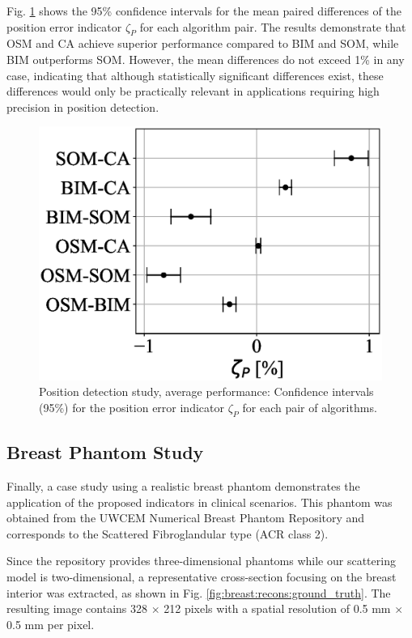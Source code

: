 \documentclass{IEEEtran}
\begin{document}
                Fig. \ref{fig:position:average:confidence_intervals} shows the 95\% confidence intervals for the mean paired differences of the position error indicator $\zeta_P$ for each algorithm pair. The results demonstrate that OSM and CA achieve superior performance compared to BIM and SOM, while BIM outperforms SOM. However, the mean differences do not exceed 1\% in any case, indicating that although statistically significant differences exist, these differences would only be practically relevant in applications requiring high precision in position detection.

                \begin{figure}
                    \centering
                    \includegraphics[width=.8\columnwidth]{./experiments/position/average/figs/confidence_intervals.eps}
                    \caption{Position detection study, average performance: Confidence intervals (95\%) for the position error indicator $\zeta_P$ for each pair of algorithms.}
                    \label{fig:position:average:confidence_intervals}
                \end{figure}

        \subsection{Breast Phantom Study}\label{sec:results:breast}

            Finally, a case study using a realistic breast phantom demonstrates the application of the proposed indicators in clinical scenarios. This phantom was obtained from the UWCEM Numerical Breast Phantom Repository \cite{burfeindt2012mri} and corresponds to the Scattered Fibroglandular type (ACR class 2). 

            Since the repository provides three-dimensional phantoms while our scattering model is two-dimensional, a representative cross-section focusing on the breast interior was extracted, as shown in Fig. \ref{fig:breast:recons:ground_truth}. The resulting image contains 328 $\times$ 212 pixels with a spatial resolution of 0.5 mm $\times$ 0.5 mm per pixel. 
\end{document}
